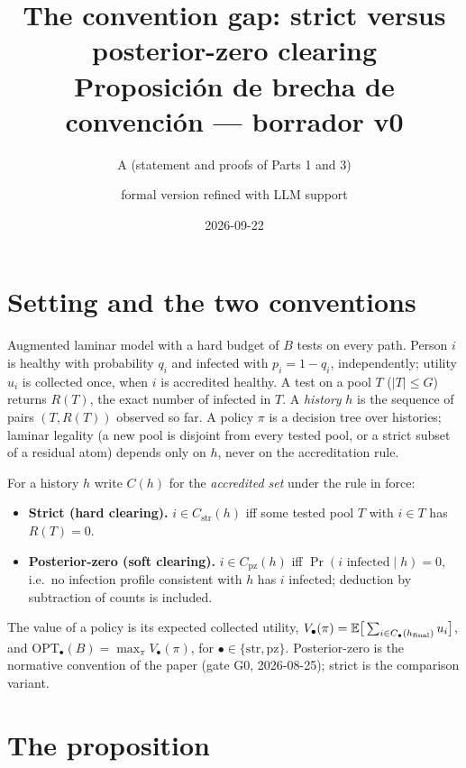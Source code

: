 \documentclass[11pt]{article}
\title{The convention gap: strict versus posterior-zero clearing\\
\large Proposición de brecha de convención --- borrador v0}
\author{A (statement and proofs of Parts 1 and 3) \and formal version refined with LLM support}
\date{2026-09-22}
\theoremstyle{remark}
\newcommand{\pz}{\mathrm{pz}}
\newcommand{\str}{\mathrm{str}}
\newcommand{\OPT}{\mathrm{OPT}}
\newcommand{\Cstr}{C_{\str}}
\newcommand{\Cpz}{C_{\pz}}
\begin{document}
\maketitle

\section{Setting and the two conventions}

Augmented laminar model with a hard budget of $B$ tests on every path. Person $i$ is healthy with probability $q_i$ and infected with $p_i = 1-q_i$, independently; utility $u_i$ is collected once, when $i$ is accredited healthy. A test on a pool $T$ ($|T|\le G$) returns $R(T)$, the exact number of infected in $T$. A \emph{history} $h$ is the sequence of pairs $(T, R(T))$ observed so far. A policy $\pi$ is a decision tree over histories; laminar legality (a new pool is disjoint from every tested pool, or a strict subset of a residual atom) depends only on $h$, never on the accreditation rule.

For a history $h$ write $C(h)$ for the \emph{accredited set} under the rule in force:
\begin{itemize}
  \item \textbf{Strict (hard clearing).} $i \in \Cstr(h)$ iff some tested pool $T$ with $i\in T$ has $R(T)=0$.
  \item \textbf{Posterior-zero (soft clearing).} $i \in \Cpz(h)$ iff $\Pr(i \text{ infected}\mid h)=0$, i.e.\ no infection profile consistent with $h$ has $i$ infected; deduction by subtraction of counts is included.
\end{itemize}
The value of a policy is its expected collected utility, $V_\bullet(\pi)=\mathbb E\big[\sum_{i\in C_\bullet(h_{\rm final})} u_i\big]$, and $\OPT_\bullet(B)=\max_\pi V_\bullet(\pi)$, for $\bullet\in\{\str,\pz\}$. Posterior-zero is the normative convention of the paper (gate G0, 2026-08-25); strict is the comparison variant.

\section{The proposition}
\end{document}
